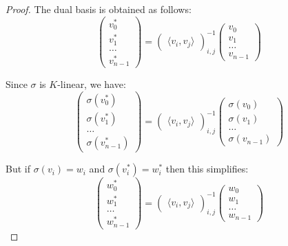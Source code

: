 \documentclass{report}
\begin{document}
\begin{proof}
The dual basis is obtained as follows:
\begin{equation}
\begin{pmatrix}
v_0^* \\ v_1^* \\ \ldots \\ v_{n-1}^*
\end{pmatrix}
=
\begin{pmatrix}
\langle v_i,v_j \rangle
\end{pmatrix}^{-1}_{i,j}
\begin{pmatrix}
v_0 \\ v_1 \\ \ldots \\ v_{n-1}
\end{pmatrix}
\end{equation}

Since $\sigma$ is $K$-linear, we have:
\begin{equation}
\begin{pmatrix}
\sigma(v_0^*) \\ \sigma(v_1^*) \\ \ldots \\ \sigma(v_{n-1}^*)
\end{pmatrix}
=
\begin{pmatrix}
\langle v_i,v_j \rangle
\end{pmatrix}^{-1}_{i,j}
\begin{pmatrix}
\sigma(v_0) \\ \sigma(v_1) \\ \ldots \\ \sigma(v_{n-1})
\end{pmatrix}
\end{equation}

But if $\sigma(v_i) = w_i$ and $\sigma(v_i^*) = w_i^*$ then this simplifies:
\begin{equation}
\begin{pmatrix}
w_0^* \\ w_1^* \\ \ldots \\ w_{n-1}^*
\end{pmatrix}
=
\begin{pmatrix}
\langle v_i,v_j \rangle
\end{pmatrix}^{-1}_{i,j}
\begin{pmatrix}
w_0 \\ w_1 \\ \ldots \\ w_{n-1}
\end{pmatrix}
\end{equation}


\end{proof}
\end{document}
